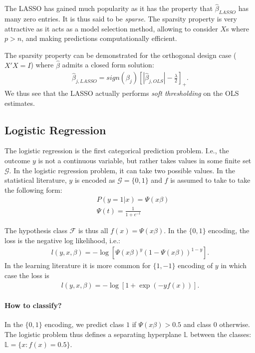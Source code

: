 \documentclass[12pt,a4paper]{article}
\theoremstyle{plain}
\theoremstyle{definition}
\newcommand{\loss}{l}
\newcommand{\hyp}{f}
\newcommand{\hypclass}{\mathcal{F}}
\newcommand{\plane}{\mathbb{L}}
\newcommand{\categories}{\mathcal{G}}
\begin{document}
The LASSO has gained much popularity as it has the property that $\hat{\beta}_{LASSO}$ has many zero entries. It is thus said to be \emph{sparse}.
The sparsity property is very attractive as it acts as a model selection method, allowing to consider $X$s where $p>n$, and making predictions computationally efficient.

The sparsity property can be demonstrated for the orthogonal design case ($X'X=I$) where $\hat{\beta}$ admits a closed form solution:
\begin{align}
	\hat{\beta}_{j,LASSO} = sign(\beta_j) \left[|\hat{\beta}_{j,OLS}|-\frac{\lambda}{2} \right]_+.
\end{align}
We thus see that the LASSO actually performs \emph{soft thresholding} on the OLS estimates. 




\subsection{Logistic Regression}
\label{sec:logistic}
The logistic regression is the first categorical prediction problem. 
I.e., the outcome $y$ is not a continuous variable, but rather takes values in some finite set $\categories$. In the logistic regression problem, it can take two possible values.
In the statistical literature, $y$ is encoded as $\categories=\{0,1\}$ and $\hyp$ is assumed to take to take the following form:
\begin{align}
	& P(y=1|x) = \Psi(x\beta) \\
	& \Psi(t) = \frac{1}{1+e^{-t}}
\end{align}

The hypothesis class $\hypclass$ is thus all $\hyp(x)=\Psi(x\beta)$.
In the $\{0,1\}$ encoding, the loss is the negative log likelihood, i.e.:
\begin{align}
	\loss(y,x,\beta) = -\log \left[ \Psi(x\beta)^{y} (1-\Psi(x\beta))^{1-y}  \right].
\end{align}
In the learning literature it is more common for $\{1,-1\}$ encoding of $y$ in which case the loss is 
\begin{align}
	\loss(y,x,\beta) = -\log \left[ 1+\exp(-y f(x))  \right].
\end{align}


\paragraph{How to classify?}
In the $\{0,1\}$ encoding, we predict class $1$ if $\Psi(x\beta)>0.5$ and class $0$ otherwise.
The logistic problem thus defines a separating hyperplane $\plane$ between the classes: $\plane=\{x:f(x)=0.5\}$.
\end{document}
